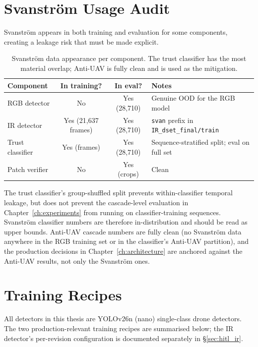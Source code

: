 \documentclass[12pt,a4paper,oneside,openright]{book}
\begin{document}
\section{Svanstr\"om Usage Audit}
\label{sec:svanstrom_audit}

Svanstr\"om appears in both training and evaluation for some components, creating a leakage risk that must be made explicit.

\begin{table}[htbp]
    \centering
    \caption{Svanstr\"om data appearance per component. The trust classifier has the most material overlap; Anti-UAV is fully clean and is used as the mitigation.}
    \label{tab:svanstrom_audit}
    \begin{tabular}{lccl}
        \toprule
        Component & In training? & In eval? & Notes \\
        \midrule
        RGB detector  & No  & Yes (28,710) & Genuine OOD for the RGB model \\
        IR detector   & Yes (21{,}637 frames) & Yes (28,710) & \texttt{svan} prefix in \texttt{IR\_dset\_final/train} \\
        Trust classifier & Yes (frames) & Yes (28,710) & Sequence-stratified split; eval on full set \\
        Patch verifier & No & Yes (crops) & Clean \\
        \bottomrule
    \end{tabular}
\end{table}

The trust classifier's group-shuffled split prevents within-classifier temporal leakage, but does not prevent the cascade-level evaluation in Chapter~\ref{ch:experiments} from running on classifier-training sequences. Svanstr\"om classifier numbers are therefore in-distribution and should be read as upper bounds. Anti-UAV cascade numbers are fully clean (no Svanstr\"om data anywhere in the RGB training set or in the classifier's Anti-UAV partition), and the production decisions in Chapter~\ref{ch:architecture} are anchored against the Anti-UAV results, not only the Svanstr\"om ones.

\section{Training Recipes}
\label{sec:training_recipes}

All detectors in this thesis are YOLOv26n (nano) single-class drone detectors. The two production-relevant training recipes are summarised below; the IR detector's per-revision configuration is documented separately in \S\ref{sec:hitl_ir}.
\end{document}
